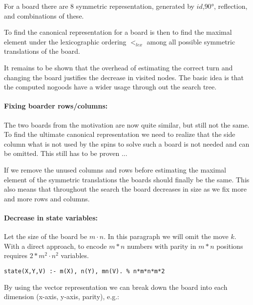 \documentclass[]{llncs}
\newcommand{\spintable}[9]{ 
\node [matrix,ampersand replacement=\&,nodes={minimum size=4mm}]
{
    \node {#1}; \& \node{#2}; \& \node {#3}; \\ 
    \node {#4}; \& \node{#5}; \& \node {#6}; \\ 
    \node {#7}; \& \node{#8}; \& \node {#9}; \\ 
}; 
}
\begin{document}
For a board there are 8 symmetric representation, generated by $id$,$90°$,
reflection, and combinations of these. 

To find the canonical representation for a board is then to find the maximal element
under the lexicographic ordering $<_{lex}$ among all possible symmetric translations
of the board.

It remains to be shown that the overhead of estimating the correct turn and changing
the board justifies the decrease in visited nodes.  The basic idea is that the
computed nogoods have a wider usage through out the search tree.

\paragraph{Fixing boarder rows/columns: } The two boards
from the motivation are now quite similar, but still not the
same. To find the ultimate canonical representation we need
to realize that the side column what is not used by the
spins to solve such a board is not needed and can be
omitted. This still has to be proven
...

If we remove the unused columns and rows before estimating
the maximal element of the symmetric translations the boards
should finally be the same. This also means that throughout
the search the board decreases in size as we fix more and
more rows and columns. 


\paragraph{Decrease in state variables: } Let the size of
the board be $m\cdot n$. In this paragraph we will omit the
move $k$. With a direct approach, to encode $m*n$ numbers
with parity in $m*n$ positions requires $2*m^2\cdot n^2$
variables.

\begin{verbatim} 
state(X,Y,V) :- m(X), n(Y), mn(V). % n*m*n*m*2 
\end{verbatim} 
By using the vector representation we can break down the
board into each dimension (x-axis, y-axis, parity), e.g.: 

\end{document}

